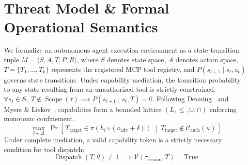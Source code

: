 \documentclass[10pt,journal,compsoc]{IEEEtran}
\begin{document}
\section{Threat Model \& Formal Operational Semantics}
We formalize an autonomous agent execution environment as a state-transition tuple $M = \langle S, A, T, P, R \rangle$, where $S$ denotes state space, $A$ denotes action space, $T = \{T_1, \dots, T_k\}$ represents the registered MCP tool registry, and $P(s_{t+1} \mid s_t, a_t)$ governs state transitions. Under capability mediation, the transition probability to any state resulting from an unauthorized tool is strictly constrained: $\forall s_t \in S, \; T \notin \operatorname{Scope}(\tau) \implies P(s_{t+1} \mid s_t, T) = 0$. Following Denning~\cite{ref_19} and Myers \& Liskov~\cite{ref_32}, capabilities form a bounded lattice $(L, \le, \cup, \cap)$ enforcing monotonic confinement.
\begin{equation}
\max_{\delta \in \Delta} \; \Pr\left[\, T_{\text{target}} \in \pi(h_t \circ (o_{\text{adv}} + \delta)) \;\middle|\; T_{\text{target}} \notin \mathcal{C}_{\text{auth}}(u) \,\right]
\end{equation}
Under complete mediation, a valid capability token is a strictly necessary condition for tool dispatch:
\begin{equation}
\operatorname{Dispatch}(T, \theta) \neq \bot \implies \mathcal{V}(\tau_{\text{session}}, T) = \text{True}
\end{equation}

\clearpage
\end{document}
